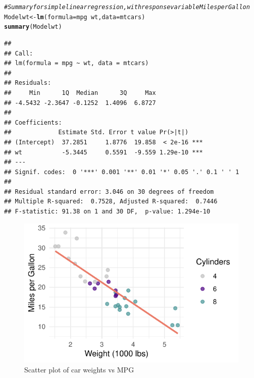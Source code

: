\documentclass{article}\usepackage[]{graphicx}\usepackage[]{xcolor}
\makeatletter
\def\maxwidth{ %
  \ifdim\Gin@nat@width>\linewidth
    \linewidth
  \else
    \Gin@nat@width
  \fi
}
\newcommand{\hlcom}[1]{\textcolor[rgb]{0.678,0.584,0.686}{\textit{#1}}}%
\newcommand{\hlopt}[1]{\textcolor[rgb]{0,0,0}{#1}}%
\newcommand{\hlstd}[1]{\textcolor[rgb]{0.345,0.345,0.345}{#1}}%
\newcommand{\hlkwb}[1]{\textcolor[rgb]{0.69,0.353,0.396}{#1}}%
\newcommand{\hlkwc}[1]{\textcolor[rgb]{0.333,0.667,0.333}{#1}}%
\newcommand{\hlkwd}[1]{\textcolor[rgb]{0.737,0.353,0.396}{\textbf{#1}}}%
\newenvironment{kframe}{%
 \def\at@end@of@kframe{}%
 \ifinner\ifhmode%
  \def\at@end@of@kframe{\end{minipage}}%
  \begin{minipage}{\columnwidth}%
 \fi\fi%
 \def\FrameCommand##1{\hskip\@totalleftmargin \hskip-\fboxsep
 \colorbox{shadecolor}{##1}\hskip-\fboxsep
     \hskip-\linewidth \hskip-\@totalleftmargin \hskip\columnwidth}%
 \MakeFramed {\advance\hsize-\width
   \@totalleftmargin\z@ \linewidth\hsize
   \@setminipage}}%
 {\par\unskip\endMakeFramed%
 \at@end@of@kframe}
\newenvironment{knitrout}{}{} %
\numberwithin{equation}{section}
\makeatother
\begin{document}
\begin{knitrout}\scriptsize
{}\color{fgcolor}\begin{kframe}
\begin{alltt}
\hlcom{# Summary for simple linear regression, with response variable Miles per Gallon}
\hlstd{Modelwt} \hlkwb{<-} \hlkwd{lm}\hlstd{(}\hlkwc{formula} \hlstd{= mpg} \hlopt{~} \hlstd{wt,} \hlkwc{data} \hlstd{= mtcars)}
\hlkwd{summary}\hlstd{(Modelwt)}
\end{alltt}
\begin{verbatim}
## 
## Call:
## lm(formula = mpg ~ wt, data = mtcars)
## 
## Residuals:
##     Min      1Q  Median      3Q     Max 
## -4.5432 -2.3647 -0.1252  1.4096  6.8727 
## 
## Coefficients:
##             Estimate Std. Error t value Pr(>|t|)    
## (Intercept)  37.2851     1.8776  19.858  < 2e-16 ***
## wt           -5.3445     0.5591  -9.559 1.29e-10 ***
## ---
## Signif. codes:  0 '***' 0.001 '**' 0.01 '*' 0.05 '.' 0.1 ' ' 1
## 
## Residual standard error: 3.046 on 30 degrees of freedom
## Multiple R-squared:  0.7528,	Adjusted R-squared:  0.7446 
## F-statistic: 91.38 on 1 and 30 DF,  p-value: 1.294e-10
\end{verbatim}
\end{kframe}
\end{knitrout}

\begin{knitrout}\scriptsize
{}\color{fgcolor}\begin{figure}[H]

{\centering \includegraphics[width=\maxwidth]{figure/beamer-scatter-plot-1} 

}

\caption[Scatter plot of car weights vs MPG]{Scatter plot of car weights vs MPG}\label{fig:scatter-plot}
\end{figure}

\end{knitrout}
\end{document}
